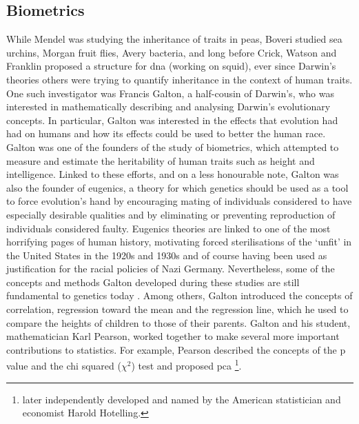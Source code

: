 \subsection{Biometrics} %
\label{sec:biometrics}

While Mendel was studying the inheritance of traits in peas, Boveri studied sea urchins, Morgan fruit flies, Avery bacteria, and long before Crick, Watson and Franklin proposed a structure for \gls{dna} (working on squid), ever since Darwin’s theories others were trying to quantify inheritance in the context of human traits. 
One such investigator was Francis Galton, a half-cousin of Darwin’s, who was interested in mathematically describing and analysing Darwin’s evolutionary concepts. 
In particular, Galton was interested in the effects that evolution had had on humans and how its effects could be used to better the human race. 
Galton was one of the founders of the study of biometrics, which attempted to measure and estimate the heritability of human traits such as height and intelligence. 
Linked to these efforts, and on a less honourable note, Galton was also the founder of eugenics, a theory for which genetics should be used as a tool to force evolution’s hand by encouraging mating of individuals considered to have especially desirable qualities and by eliminating or preventing reproduction of individuals considered faulty. Eugenics theories are linked to one of the most horrifying pages of human history, motivating forced sterilisations of the `unfit' in the United States in the 1920s and 1930s and of course having been used as justification for the racial policies of Nazi Germany.
Nevertheless, some of the concepts and methods Galton developed during these studies are still fundamental to genetics today \cite{galton1870hereditary}. 
Among others, Galton introduced the concepts of correlation, regression toward the mean and the regression line, which he used to compare the heights of children to those of their parents. 
Galton and his student, mathematician Karl Pearson, worked together to make several more important contributions to statistics. 
For example, Pearson described the concepts of the p value and the chi squared ($\chi^2$) test \cite{pearson1900x} and proposed \gls{pca} \cite{pearson1901liii}\footnote{later independently developed and named by the American statistician and economist Harold Hotelling.}.

